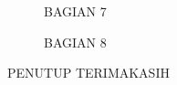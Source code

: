 \documentclass{beamer}
\begin{document}
\begin{frame}
    
\begin{figure}
    \centering
    \caption{BAGIAN 7}
    \label{fig:enter-label}
\end{figure}
\end{frame}
\begin{frame}
    
\begin{figure}
    \centering
    \caption{BAGIAN 8}
    \label{fig:enter-label}
\end{figure}
\end{frame}
\begin{frame}{PENUTUP}
    \centering TERIMAKASIH
\end{frame}
\end{document}
